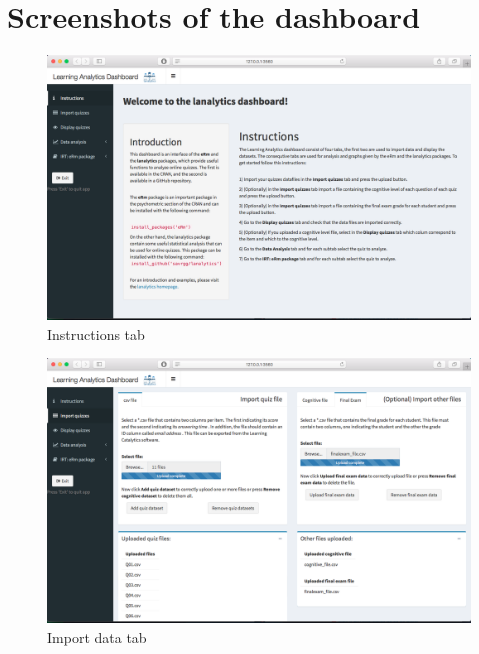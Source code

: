 \chapter{Screenshots of the dashboard}
\label{chap:screenshots}


\begin{figure}[ht!]
\centering
\includegraphics[width=\linewidth]{img/d_1.png}
\caption{Instructions tab}
\label{img:d_1}
\end{figure}

\begin{figure}[ht!]
\centering
\includegraphics[width=\linewidth]{img/d_2.png}
\caption{Import data tab}
\label{img:d_2}
\end{figure}

